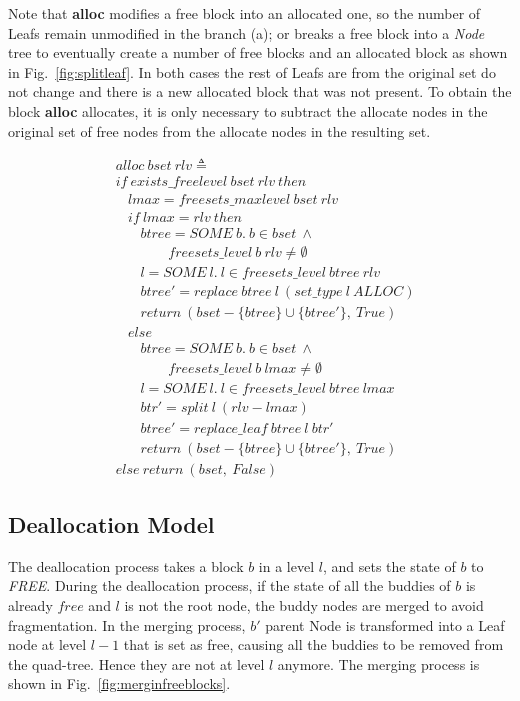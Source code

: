Note that \textbf{alloc} modifies a free block into an allocated one, so the number of Leafs remain unmodified in the branch (a); or breaks a free block into a \emph{Node} tree to eventually create a number of free blocks and an allocated block as shown in Fig.~\ref{fig:splitleaf}. In both cases the rest of Leafs are from the original set do not change and there is a new allocated block that was not present. To obtain the block \textbf{alloc} allocates, it is only necessary to subtract the allocate nodes in the original set of free nodes from the allocate nodes in the resulting set.

\begin{definition} 
\begin{align*}
&alloc\ bset\ rlv \triangleq \\
&if\ exists\_freelevel\ bset\ rlv\ then \\
&\ \ \ \ lmax = freesets\_maxlevel\ bset\ rlv \\
&\ \ \ \ if\ lmax = rlv\ then \\
&\ \ \ \ \ \ \ \ btree = SOME\ b.\ b \in bset\ \wedge\\
&\ \ \ \ \ \ \ \ \ \ \ \ \ \ \ \ \ freesets\_level\ b\ rlv \ne \emptyset \\
&\ \ \ \ \ \ \ \ l = SOME\ l.\ l \in freesets\_level\ btree\ rlv \\
&\ \ \ \ \ \ \ \ btree' = replace\ btree\ l\ (set\_type\ l\ ALLOC) \\
&\ \ \ \ \ \ \ \ return\ (bset - \lbrace btree \rbrace \cup \lbrace btree' \rbrace,\ True) \\
&\ \ \ \ else \\
&\ \ \ \ \ \ \ \ btree = SOME\ b.\ b \in bset\ \wedge\\
&\ \ \ \ \ \ \ \ \ \ \ \ \ \ \ \ \ freesets\_level\ b\ lmax \ne \emptyset \\
&\ \ \ \ \ \ \ \ l = SOME\ l.\ l \in freesets\_level\ btree\ lmax \\
&\ \ \ \ \ \ \ \ btr' = split\ l\ (rlv - lmax) \\
&\ \ \ \ \ \ \ \ btree' = replace\_leaf\ btree\ l\ btr' \\
&\ \ \ \ \ \ \ \ return\ (bset - \lbrace btree \rbrace \cup \lbrace btree' \rbrace,\ True) \\
&else\ return\ (bset,\ False)
\end{align*}
\end{definition}

\subsection{Deallocation Model}
The deallocation process takes a block $b$ in a level $l$, and sets the state of $b$ to \emph{FREE}. During the deallocation process, if the state of all the buddies of $b$ is already $free$ and $l$ is not the root node, the buddy nodes are merged to avoid fragmentation. In the merging process, $b'$ parent Node is transformed into a Leaf node at level $l - 1$ that is set as free, causing all the buddies to be removed from the quad-tree. Hence they are not at level $l$ anymore. The merging process is shown in Fig.~\ref{fig:merginfreeblocks}.

